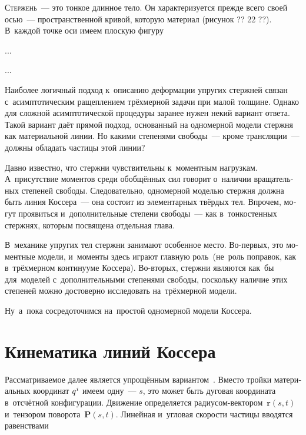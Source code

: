\begin{otherlanguage}{russian}

\lettrine[lines=2, findent=2pt, nindent=0pt]{С}{тержень}~--- это тонкое длинное тело. Он характеризуется прежде всего своей осью~--- пространственной кривой, которую  материал (рисунок ?? 22 ??). В~каждой точке оси имеем плоскую фигуру

...


...


Наиболее логичный подход к~описанию деформации упругих стержней связан с~асимптотическим ращеплением трёхмерной задачи при малой толщине. Однако для сложной асимптотической процедуры заранее нужен некий вариант ответа. Такой вариант даёт прямой подход, основанный на одномерной модели стержня как материальной линии. Но какими степенями свободы~--- кроме трансляции~--- должны обладать частицы этой линии?

Давно известно, что стержни чувствительны к~моментным нагрузкам. А~присутствие моментов среди обобщённых сил говорит о~наличии вращательных степеней свободы. Следовательно, одномерной моделью стержня должна быть линия Коссера~--- она состоит из элементарных твёрдых тел. Впрочем, могут проявиться и~дополнительные степени свободы~--- как в~тонкостенных стержнях, которым посвящена отдельная глава.

В~механике упругих тел стержни занимают особенное место. Во\hbox{-}первых, это моментные модели, и~моменты здесь играют главную роль~(не~роль поправок, как в~трёхмерном континууме Коссера). Во\hbox{-}вторых, стержни являются как~бы  для~моделей с~дополнительными степенями свободы, поскольку наличие этих степеней можно достоверно исследовать на~трёх\-мерной модели.

Ну~а~пока сосредоточимся на~простой одномерной модели Коссера.

\section{Кинематика линий Коссера}

Рассматриваемое далее является упрощённым вариантом~. Вместо тройки материальных координат ${q^{\hspace{.1ex}i}}$ имеем одну~--- $s$, это может быть дуговая координата в~отсчётной конфигурации. Движение определяется радиусом-вектором~${\bm{r}(s,t)}$ и~тензором поворота~${\bm{P}(s,t)}$. Линейная и~угловая скорости частицы вводятся равенствами


\end{otherlanguage}
